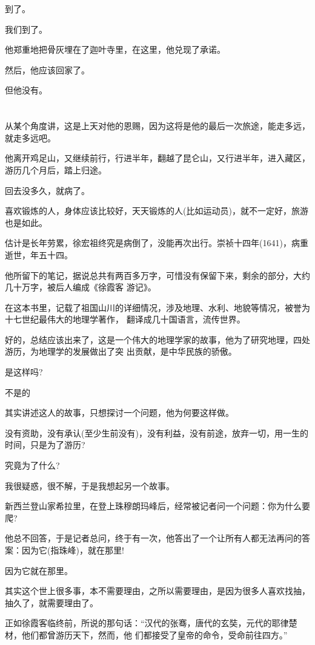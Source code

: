 \documentclass[11pt,a4paper,onecolumn]{article}
\begin{document}
到了。

我们到了。

他郑重地把骨灰埋在了迦叶寺里，在这里，他兑现了承诺。

然后，他应该回家了。

但他没有。

\section[\thesection]{}

从某个角度讲，这是上天对他的恩赐，因为这将是他的最后一次旅途，能走多远，就走多远吧。

他离开鸡足山，又继续前行，行进半年，翻越了昆仑山，又行进半年，进入藏区，游历几个月后，踏上归途。

回去没多久，就病了。

喜欢锻炼的人，身体应该比较好，天天锻炼的人(比如运动员)，就不一定好，旅游也是如此。

估计是长年劳累，徐宏祖终究是病倒了，没能再次出行。崇祯十四年(1641)，病重逝世，年五十四。

他所留下的笔记，据说总共有两百多万字，可惜没有保留下来，剩余的部分，大约几十万字，被后人编成《徐霞客
游记》。

在这本书里，记载了祖国山川的详细情况，涉及地理、水利、地貌等情况，被誉为十七世纪最伟大的地理学著作，
翻译成几十国语言，流传世界。

好的，总结应该出来了，这是一个伟大的地理学家的故事，他为了研究地理，四处游历，为地理学的发展做出了突
出贡献，是中华民族的骄傲。

是这样吗?

不是的

其实讲述这人的故事，只想探讨一个问题，他为何要这样做。

没有资助，没有承认(至少生前没有)，没有利益，没有前途，放弃一切，用一生的时间，只是为了游历?

究竟为了什么?

我很疑惑，很不解，于是我想起另一个故事。

新西兰登山家希拉里，在登上珠穆朗玛峰后，经常被记者问一个问题：你为什么要爬?

他总不回答，于是记者总问，终于有一次，他答出了一个让所有人都无法再问的答案：因为它(指珠峰)，就在那里!

因为它就在那里。

其实这个世上很多事，本不需要理由，之所以需要理由，是因为很多人喜欢找抽，抽久了，就需要理由了。

正如徐霞客临终前，所说的那句话：``汉代的张骞，唐代的玄奘，元代的耶律楚材，他们都曾游历天下，然而，他
们都接受了皇帝的命令，受命前往四方。''
\end{document}
